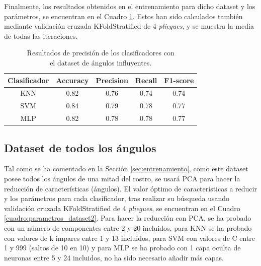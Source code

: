 Finalmente, los resultados obtenidos en el entrenamiento para dicho dataset y los parámetros, se encuentran en el Cuadro \ref{cuadro:resultados_dataset1}. Estos han sido calculados también mediante validación cruzada KFoldStratified de 4 \textit{pliegues}, y se muestra la media de todas las iteraciones.\\

\begin{table}[H]
\begin{center}
\begin{tabular}{|c|c|c|c|c|}
     \hline
    \textbf{Clasificador} & \textbf{Accuracy} & \textbf{Precision} & \textbf{Recall} & \textbf{F1-score}\\
    \hline
     KNN & 0.82 & 0.76 & 0.74 & 0.74\\
     SVM & 0.84 & 0.79 & 0.78 & 0.77\\
     MLP & 0.82 & 0.78 & 0.78 & 0.77\\
     \hline
 \end{tabular}
 \captionsetup{justification=centering}
\caption{Resultados de precisión de los clasificadores con\\
el dataset de ángulos influyentes.}
\label{cuadro:resultados_dataset1}
\end{center}
\end{table}

\subsection{Dataset de todos los ángulos}

Tal como se ha comentado en la Sección \ref{sec:entrenamiento}, como este dataset posee todos los ángulos de una mitad del rostro, se usará PCA para hacer la reducción de características (ángulos). El valor óptimo de características a reducir y los parámetros para cada clasificador, tras realizar su búsqueda usando validación cruzada KFoldStratified de 4 \textit{pliegues}, se encuentran en el Cuadro \ref{cuadro:parametros_dataset2}. Para hacer la reducción con PCA, se ha probado con un número de componentes entre 2 y 20 incluidos, para KNN se ha probado con valores de k impares entre 1 y 13 incluidos, para SVM con valores de C entre 1 y 999 (saltos de 10 en 10) y para MLP se ha probado con 1 capa oculta de neuronas entre 5 y 24 incluidos, no ha sido necesario añadir más capas.\\

